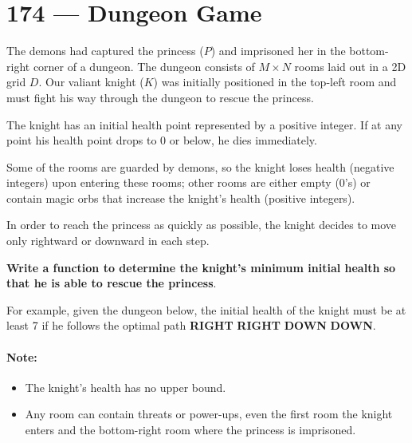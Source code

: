 \section{174 --- Dungeon Game}
The demons had captured the princess ($P$) and imprisoned her in the bottom-right corner of a dungeon. The dungeon consists of $M \times N$ rooms laid out in a 2D grid $D$. Our valiant knight ($K$) was initially positioned in the top-left room and must fight his way through the dungeon to rescue the princess.
\par
The knight has an initial health point represented by a positive integer. If at any point his health point drops to 0 or below, he dies immediately.
\par
Some of the rooms are guarded by demons, so the knight loses health (negative integers) upon entering these rooms; other rooms are either empty (0's) or contain magic orbs that increase the knight's health (positive integers).
\par
In order to reach the princess as quickly as possible, the knight decides to move only rightward or downward in each step.
\par
\textbf{Write a function to determine the knight's minimum initial health so that he is able to rescue the princess}.
\par
For example, given the dungeon below, the initial health of the knight must be at least 7 if he follows the optimal path \textbf{RIGHT} \textrightarrow \textbf{RIGHT} \textrightarrow \textbf{DOWN} \textrightarrow \textbf{DOWN}.


\begin{figure}[H]
\end{figure}
\paragraph{Note:}
\begin{itemize}
\item The knight's health has no upper bound.
\item Any room can contain threats or power-ups, even the first room the knight enters and the bottom-right room where the princess is imprisoned.
\end{itemize}
